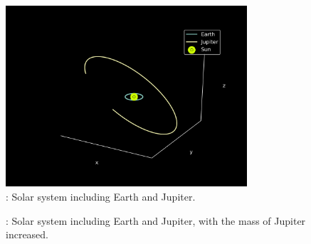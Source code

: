 \documentclass{article}
\begin{document}
\begin{figure}[H]
    \begin{center}
        \includegraphics[width=0.8\textwidth]{./Plot/Earth_Jupiter1.png}
        \caption{: Solar system including Earth and Jupiter.}
        \label{fig:jupiter1}
    \end{center}
\end{figure}

\begin{figure}[H]
    \caption{: Solar system including Earth and Jupiter, with the mass of Jupiter increased.}
    \label{fig:jupiter}
    \end{figure}
\end{document}
